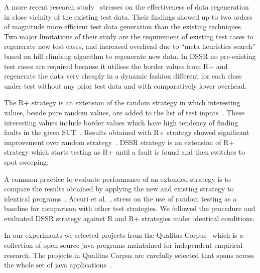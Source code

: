 A more recent research study~\cite{yoo2012test} stresses on the effectiveness of data regeneration in close vicinity of the existing test data. Their findings showed up to two orders of magnitude more efficient test data generation than the existing techniques. Two major limitations of their study are the requirement of existing test cases to regenerate new test cases, and increased overhead due to ``meta heuristics search'' based on hill climbing algorithm to regenerate new data. In DSSR no pre-existing test cases are required because it utilises the border values from R+ and regenerate the data very cheaply in a dynamic fashion different for each class under test without any prior test data and with comparatively lower overhead. 
  
The R+ strategy is an extension of the random strategy in which interesting values, beside pure random values, are added to the list of test inputs~\cite{leitner2007reconciling}. These interesting values include border values which have high tendency of finding faults in the given SUT~\cite{beizer2003software}. Results obtained with R+ strategy showed significant improvement over random strategy~\cite{leitner2007reconciling}. DSSR strategy is an extension of R+ strategy which starts testing as R+ until a fault is found and then switches to spot sweeping.



A common practice to evaluate performance of an extended strategy is to compare the results obtained by applying the new and existing strategy to identical programs~\cite{hamlet1990partition, duran1984evaluation, gutjahr1999partition}. Arcuri et al.~\cite{arcuri2012random}, stress on the use of random testing as a baseline for comparison with other test strategies. We followed the procedure and evaluated DSSR strategy against R and R+ strategies under identical conditions.

In our experiments we selected projects from the Qualitas Corpus~\cite{tempero2010qualitas} which is a collection of open source java programs maintained for independent empirical research. The projects in Qualitas Corpus are carefully selected that spans across the whole set of java applications~\cite{oriol2012random, tempero2010empirical, tempero2008empirical}.


